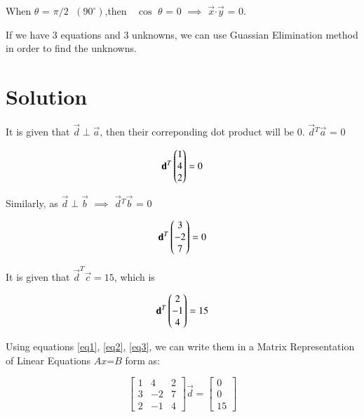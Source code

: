 \documentclass[journal,12pt,twocolumn]{IEEEtran}
\begin{document}
	When $\theta$ = $\pi/2$ $\;$$(90^\circ)$,then $\;$ $\cos$ $\theta$  = 0 $\implies$ $\vec{x}$$\cdot$$\vec{y}$ = 0.
	
	If we have 3 equations and 3 unknowns, we can use Guassian Elimination method in order to find the unknowns.
	
\section{\textbf{Solution}}

	It is given that $\vec{d}\perp\vec{a}$, then their correponding dot product will be 0.\hfill \break
		$\vec{d}$$^{T}$$\vec{a}$ = 0 		

	\begin{equation}\label{eq1}
		\mathbf{d}^{T} \begin{pmatrix}1\\4\\2\end{pmatrix} = 0
	\end{equation}

	Similarly, as $\vec{d}\perp\vec{b}$ $\implies$ 
	$\vec{d}$$^{T}$$\vec{b}$ = 0 
		
	\begin{equation}\label{eq2}
			\mathbf{d}^{T} \begin{pmatrix}3\\-2\\7\end{pmatrix} = 0  
	\end{equation} 

	It is given that $\vec{d}^T\vec{c} = 15$, which is 
	
	
	\begin{equation}\label{eq3}
		\mathbf{d}^{T} \begin{pmatrix}2\\-1\\4\end{pmatrix} = 15
	\end{equation} 
    
    
    
    Using equations \ref{eq1}, \ref{eq2}, \ref{eq3}, we can write them in a Matrix Representation of Linear Equations $A$$x$=$B$ form as:
    
    \[
    \begin{bmatrix}
    	1 & 4 & 2 \\
    	3 & -2 & 7 \\
    	2 & -1 & 4 
    \end{bmatrix}
    \vec{d}
    =
    \begin{bmatrix}
    	0 \\ 0 \\ 15
    \end{bmatrix}
    \]
     
\end{document}

